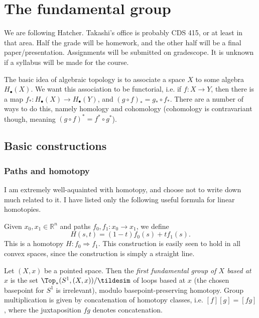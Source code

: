 \chapter{The fundamental group}


We are following Hatcher. Takashi's office is probably CDS 415, or at least in that area. Half the grade will be homework, and the other half will be a final paper/presentation. Assignments will be submitted on gradescope. It is unknown if a syllabus will be made for the course.

The basic idea of algebraic topology is to associate a space $X$ to some algebra $H_{\bullet}(X)$. We want this association to be functorial, i.e. if $f : X \to Y$, then there is a map $f_* : H_{\bullet}(X) \to H_{\bullet}(Y)$, and $(g\circ f)_* = g_*\circ f_*$. There are a number of ways to do this, namely homology and cohomology (cohomology is contravariant though, meaning $(g\circ f)^* = f^*\circ g^*$).

\section{Basic constructions}

\subsection{Paths and homotopy}

I am extremely well-aquainted with homotopy, and choose not to write down much related to it. I have listed only the following useful formula for linear homotopies.

Given $x_0,x_1\in \mathbb{R} ^n$ and paths $f_0,f_1 : x_0 \to x_1$, we define
\[
	H(s,t) = (1-t)f_0(s)+tf_1(s)
.\]
This is a homotopy $H: f_0 \Rightarrow f_1$. This construction is easily seen to hold in all convex spaces, since the construction is simply a straight line.

\begin{definition}\label{dfn:1.1.1}
	Let $(X,x)$ be a pointed space. Then the \emph{first fundamental group of $X$ based at $x$} is the set $\Top_*(S^1,(X,x)) / \tildesim $ of loops based at $x$ (the chosen basepoint for $S^1$ is irrelevant), modulo basepoint-preserving homotopy. Group multiplication is given by concatenation of homotopy classes, i.e. $[f][g] = [fg]$, where the juxtaposition $fg$ denotes concatenation.
\end{definition}

